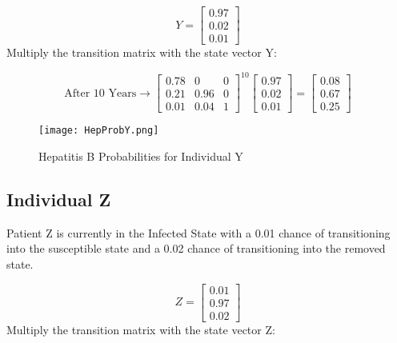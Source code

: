 \documentclass{article}
\begin{document}
\begin{equation*}
    Y = 
    \begin{bmatrix}
    0.97 \\
    0.02 \\
    0.01
   \end{bmatrix}
\end{equation*}
Multiply the transition matrix with the state vector Y:

\begin{equation*}
\text{After 10 Years}
\longrightarrow
   \begin{bmatrix}
    0.78 & 0 & 0 \\
    0.21 & 0.96 & 0 \\
    0.01 & 0.04 & 1
    \end{bmatrix} ^{10}
    \begin{bmatrix}
        0.97 \\
        0.02 \\
        0.01
   \end{bmatrix}
   =
   \begin{bmatrix}
        0.08 \\
        0.67 \\
        0.25
   \end{bmatrix}
\end{equation*}

\begin{figure}[htp]
    \centering
    \texttt{[image: HepProbY.png]}
    \caption{Hepatitis B Probabilities for Individual Y}
\end{figure}

\newpage
\subsection{Individual Z}
Patient Z is currently in the Infected State with a 0.01 chance of transitioning into the susceptible state and a 0.02 chance of transitioning into the removed state.

\begin{equation*}
    Z = 
    \begin{bmatrix}
    0.01 \\
    0.97 \\
    0.02
   \end{bmatrix}
\end{equation*}
Multiply the transition matrix with the state vector Z:
\end{document}

